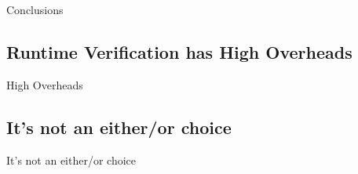 \documentclass[12pt]{beamer}
\begin{document}
\begin{frame}{Conclusions}

\end{frame}

\subsection{Runtime Verification has High Overheads}
\label{sec:conc-over}

\begin{frame}{High Overheads}

\end{frame}

\subsection{It's not an either/or choice}
\label{sec:conc-dich}

\begin{frame}{It's not an either/or choice}

\end{frame}
\end{document}
